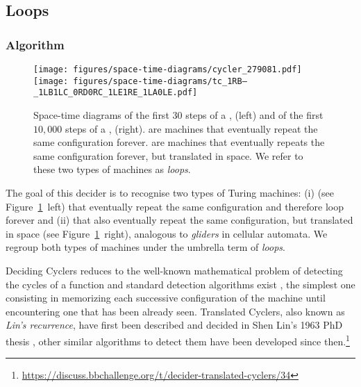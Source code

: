 \newpage
\subsection{Loops}\label{sec:loops}
\subsubsection{Algorithm}\label{sec:loops:algo}

\begin{figure}[h!]
    \centering
    \texttt{[image: figures/space-time-diagrams/cycler\_279081.pdf]}
    \hspace{10ex}
    \texttt{[image: figures/space-time-diagrams/tc\_1RB---\_1LB1LC\_0RD0RC\_1LE1RE\_1LA0LE.pdf]}
    \caption{Space-time diagrams of the first 30 steps of a \textit{\cycler},  (left) and of the first $10{,}000$ steps of a \textit{\TC},  (right). \cyclers are machines that eventually repeat the same configuration forever. \TCs are machines that eventually repeats the same configuration forever, but translated in space. We refer to these two types of machines as \textit{loops}.}\label{fig:loops}
\end{figure}


The goal of this decider is to recognise two types of Turing machines: (i) \textit{\cyclers} (see Figure~\ref{fig:loops}~left) that eventually repeat the same configuration and therefore loop forever and (ii) \textit{\TCs} that also eventually repeat the same configuration, but translated in space (see Figure~\ref{fig:loops}~right), analogous to \textit{gliders} in cellular automata. We regroup both types of machines under the umbrella term of \textit{loops}.

Deciding Cyclers reduces to the well-known mathematical problem of detecting the cycles of a function and standard detection algorithms exist \cite{wiki:Cycle_detection}, the simplest one consisting in memorizing each successive configuration of the machine until encountering one that has been already seen. Translated Cyclers, also known as \textit{Lin's recurrence}, have first been described and decided in Shen Lin's 1963 PhD thesis \cite{Lin1963}, other similar algorithms to detect them have been developed since then.\footnote{\url{https://discuss.bbchallenge.org/t/decider-translated-cyclers/34}}

